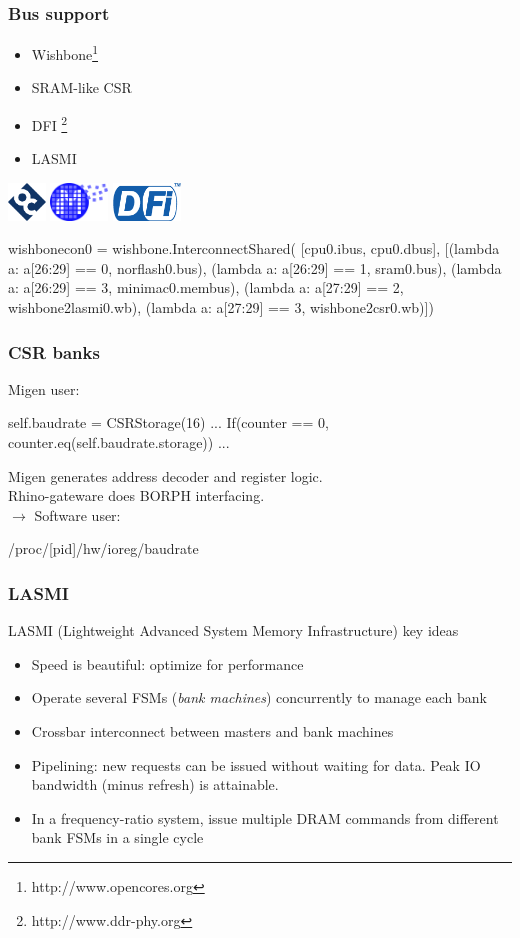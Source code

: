 \documentclass{beamer}
\begin{document}
\begin{frame}[fragile]
\frametitle{Bus support}
\begin{itemize}
\item Wishbone\footnote{http://www.opencores.org}
\item SRAM-like CSR
\item DFI \footnote{http://www.ddr-phy.org}
\item LASMI
\end{itemize}
\centering \includegraphics[height=1cm]{opencores.png} \includegraphics[height=1cm]{milkymist.png} \includegraphics[height=1cm]{dfi.png}
\begin{verbatimtab}
wishbonecon0 = wishbone.InterconnectShared(
        [cpu0.ibus, cpu0.dbus],
        [(lambda a: a[26:29] == 0, norflash0.bus),
         (lambda a: a[26:29] == 1, sram0.bus),
         (lambda a: a[26:29] == 3, minimac0.membus),
         (lambda a: a[27:29] == 2, wishbone2lasmi0.wb),
         (lambda a: a[27:29] == 3, wishbone2csr0.wb)])
\end{verbatimtab}
\end{frame}

\begin{frame}[fragile]
\frametitle{CSR banks}
Migen user:
\begin{verbatimtab}
self.baudrate = CSRStorage(16)
... If(counter == 0,
  counter.eq(self.baudrate.storage))
...
\end{verbatimtab}
Migen generates address decoder and register logic. \\
Rhino-gateware does BORPH interfacing. \\
$\rightarrow$ Software user:
\begin{verbatimtab}
/proc/[pid]/hw/ioreg/baudrate
\end{verbatimtab}
\end{frame}

\begin{frame}
\frametitle{LASMI}
LASMI (Lightweight Advanced System Memory Infrastructure) key ideas
\begin{itemize}
\item Speed is beautiful: optimize for performance
\item Operate several FSMs (\textit{bank machines}) concurrently to manage each bank
\item Crossbar interconnect between masters and bank machines
\item Pipelining: new requests can be issued without waiting for data. Peak IO bandwidth (minus refresh) is attainable.
\item In a frequency-ratio system, issue multiple DRAM commands from different bank FSMs in a single cycle
\end{itemize}
\end{frame}
\end{document}
